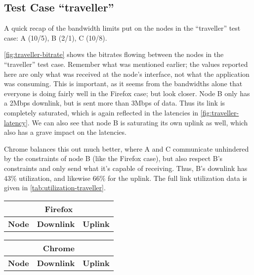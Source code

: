\subsection{Test Case ``traveller''}

A quick recap of the bandwidth limits put on the nodes in the ``traveller'' test case: A (10/5), B (2/1), C (10/8).

\autoref{fig:traveller-bitrate} shows the bitrates flowing between the nodes in the ``traveller'' test case. Remember what was mentioned earlier; the values reported here are only what was received at the node's interface, not what the application was consuming. This is important, as it seems from the bandwidths alone that everyone is doing fairly well in the Firefox case; but look closer. Node B only has a 2Mbps downlink, but is sent more than 3Mbps of data. Thus its link is completely saturated, which is again reflected in the latencies in \autoref{fig:traveller-latency}. We can also see that node B is saturating its own uplink as well, which also has a grave impact on the latencies.

Chrome balances this out much better, where A and C communicate unhindered by the constraints of node B (like the Firefox case), but also respect B's constraints and only send what it's capable of receiving. Thus, B's downlink has 43\% utilization, and likewise 66\% for the uplink. The full link utilization data is given in \autoref{tab:utilization-traveller}.

\begin{center}
    \label{tab:utilization-traveller}
    \begin{tabular}{| l | l | l |}
    \multicolumn{3}{c}{\textbf{Firefox}} \\ \hline
    \textbf{Node} & \textbf{Downlink} & \textbf{Uplink} \\ \hline
    
    \hline
    \end{tabular}
    \hfill
    \begin{tabular}{| l | l | l |}
    \multicolumn{3}{c}{\textbf{Chrome}} \\ \hline
    \textbf{Node} & \textbf{Downlink} & \textbf{Uplink} \\ \hline
    
    \hline
    \end{tabular}
\end{center}


